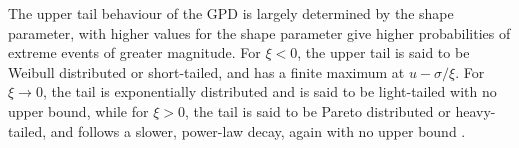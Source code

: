 \documentclass{article}
\numberwithin{equation}{section}
\begin{document}
The upper tail behaviour of the GPD is largely determined by the shape parameter, with higher values for the shape parameter give higher probabilities of extreme events of greater magnitude. 
For $\xi <0$, the upper tail is said to be Weibull distributed or short-tailed, and has a finite maximum at $u - \sigma/\xi$.
For $\xi \to 0$, the tail is exponentially distributed and is said to be light-tailed with no upper bound, while for $\xi > 0$, the tail is said to be Pareto distributed or heavy-tailed, and follows a slower, power-law decay, again with no upper bound \citep{Rohrbeck2021} \citep{Carreau2017}.



\end{document}
